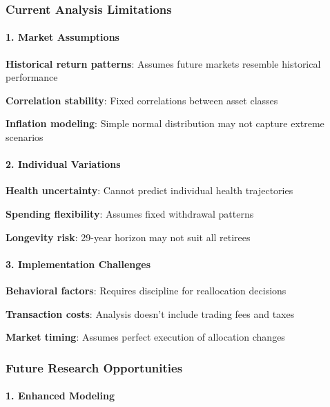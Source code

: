 \documentclass[11pt,letterpaper]{article}
\begin{document}
{{{{{{{{{{{\subsubsection{Current Analysis Limitations}


\paragraph{1. Market Assumptions}

\item \textbf{Historical return patterns}: Assumes future markets resemble historical performance
\item \textbf{Correlation stability}: Fixed correlations between asset classes
\item \textbf{Inflation modeling}: Simple normal distribution may not capture extreme scenarios

\paragraph{2. Individual Variations}

\item \textbf{Health uncertainty}: Cannot predict individual health trajectories
\item \textbf{Spending flexibility}: Assumes fixed withdrawal patterns
\item \textbf{Longevity risk}: 29-year horizon may not suit all retirees

\paragraph{3. Implementation Challenges}

\item \textbf{Behavioral factors}: Requires discipline for reallocation decisions
\item \textbf{Transaction costs}: Analysis doesn't include trading fees and taxes
\item \textbf{Market timing}: Assumes perfect execution of allocation changes

\subsubsection{Future Research Opportunities}


\paragraph{1. Enhanced Modeling}

}}}}}}}}}}}
\end{document}
